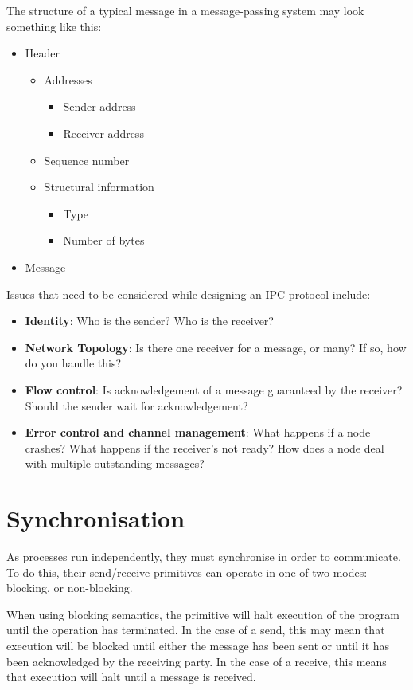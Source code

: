 The structure of a typical message in a message-passing system may look something like this:
\begin{itemize}
\item Header \begin{itemize}
	\item Addresses \begin{itemize}
		\item Sender address
		\item Receiver address
	\end{itemize}
	\item Sequence number
	\item Structural information \begin{itemize}
		\item Type
		\item Number of bytes
	\end{itemize}
	\end{itemize}
\item Message
\end{itemize}

Issues that need to be considered while designing an IPC protocol include:
\begin{itemize}
\item \textbf{Identity}: Who is the sender? Who is the receiver?
\item \textbf{Network Topology}: Is there one receiver for a message, or many? If so, how do you handle this?
\item \textbf{Flow control}: Is acknowledgement of a message guaranteed by the receiver? Should the sender wait for acknowledgement?
\item \textbf{Error control and channel management}: What happens if a node crashes? What happens if the receiver's not ready? How does a node deal with multiple outstanding messages?
\end{itemize}

\section{Synchronisation}
As processes run independently, they must synchronise in order to communicate. To do this, their send/receive primitives can operate in one of two modes: blocking, or non-blocking.

When using blocking semantics, the primitive will halt execution of the program until the operation has terminated. In the case of a send, this may mean that execution will be blocked until either the message has been sent or until it has been acknowledged by the receiving party. In the case of a receive, this means that execution will halt until a message is received.

